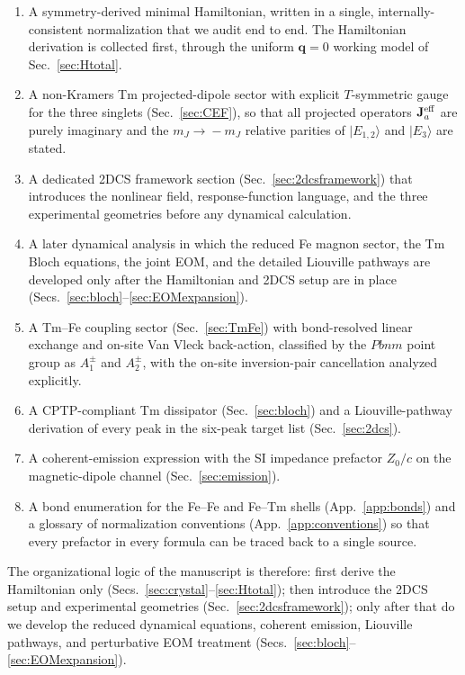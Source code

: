 \documentclass[reprint,amsmath,amssymb,aps,prb,longbibliography]{revtex4-2}
\newcommand{\Jeff}{\mathbf{J}^{\rm eff}}
\begin{document}
\begin{enumerate}[leftmargin=*]
\item A symmetry-derived minimal Hamiltonian, written in a single,
internally-consistent normalization that we audit end to end. The
Hamiltonian derivation is collected first, through the uniform
$\mathbf q=0$ working model of Sec.~\ref{sec:Htotal}.
\item A non-Kramers Tm projected-dipole sector with explicit
$T$-symmetric gauge for the three singlets (Sec.~\ref{sec:CEF}), so that
all projected operators $\Jeff_a$ are purely imaginary and the
$m_J\!\to\!-m_J$ relative parities of $|E_{1,2}\rangle$ and $|E_3\rangle$
are stated.
\item A dedicated 2DCS framework section (Sec.~\ref{sec:2dcsframework})
that introduces the nonlinear field, response-function language, and the
three experimental geometries before any dynamical calculation.
\item A later dynamical analysis in which the reduced Fe magnon sector,
the Tm Bloch equations, the joint EOM, and the detailed Liouville
pathways are developed only after the Hamiltonian and 2DCS setup are in
place (Secs.~\ref{sec:bloch}--\ref{sec:EOMexpansion}).
\item A Tm--Fe coupling sector (Sec.~\ref{sec:TmFe}) with bond-resolved
linear exchange and on-site Van Vleck back-action, classified by the
$Pbnm$ point group as $A_1^\pm$ and $A_2^\pm$, with the on-site
inversion-pair cancellation analyzed explicitly.
\item A CPTP-compliant Tm dissipator (Sec.~\ref{sec:bloch}) and a
Liouville-pathway derivation of every peak in the six-peak target list
(Sec.~\ref{sec:2dcs}).
\item A coherent-emission expression with the SI impedance prefactor
$Z_0/c$ on the magnetic-dipole channel (Sec.~\ref{sec:emission}).
\item A bond enumeration for the Fe--Fe and Fe--Tm shells
(App.~\ref{app:bonds}) and a glossary of normalization conventions
(App.~\ref{app:conventions}) so that every prefactor in every formula can
be traced back to a single source.
\end{enumerate}

The organizational logic of the manuscript is therefore: first derive the
Hamiltonian only (Secs.~\ref{sec:crystal}--\ref{sec:Htotal}); then
introduce the 2DCS setup and experimental geometries
(Sec.~\ref{sec:2dcsframework}); only after that do we develop the reduced
dynamical equations, coherent emission, Liouville pathways, and
perturbative EOM treatment (Secs.~\ref{sec:bloch}--\ref{sec:EOMexpansion}).
\end{document}
